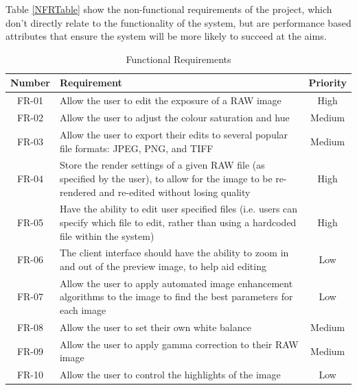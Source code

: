 \documentclass[12pt,a4paper]{article}
\begin{document}
Table \ref{NFRTable} show the non-functional requirements of the project, which don't directly relate
to the functionality of the system, but are performance based attributes that ensure the system
will be more likely to succeed at the aims.

\begin{table}
  \centering
  \begin{tabular}{| c | p{12cm} | c |}
    \hline
    \textbf{Number} & \textbf{Requirement} & \textbf{Priority} \\
    \hline
    FR-01 & Allow the user to edit the exposure of a RAW image & High \\
    \hline
    FR-02 & Allow the user to adjust the colour saturation and hue & Medium \\
    \hline
    FR-03 & Allow the user to export their edits to several popular file formats: JPEG, PNG, and TIFF & Medium \\
    \hline
    FR-04 & Store the render settings of a given RAW file (as specified by the user), to allow for the image to be re-rendered and re-edited without losing quality & High \\
    \hline
    FR-05 & Have the ability to edit user specified files (i.e. users can specify which file to edit, rather than using a hardcoded file within the system) & High \\
    \hline
    FR-06 & The client interface should have the ability to zoom in and out of the preview image, to help aid editing & Low \\
    \hline
    FR-07 & Allow the user to apply automated image enhancement algorithms to the image to find the best parameters for each image & Low \\
    \hline
    FR-08 & Allow the user to set their own white balance & Medium\\
    \hline
    FR-09 & Allow the user to apply gamma correction to their RAW image & Medium\\
    \hline
    FR-10 & Allow the user to control the highlights of the image & Low\\
    \hline
  \end{tabular}
  \caption{Functional Requirements}
  \label{FunctionalRequirementsTable}
\end{table}
\end{document}
